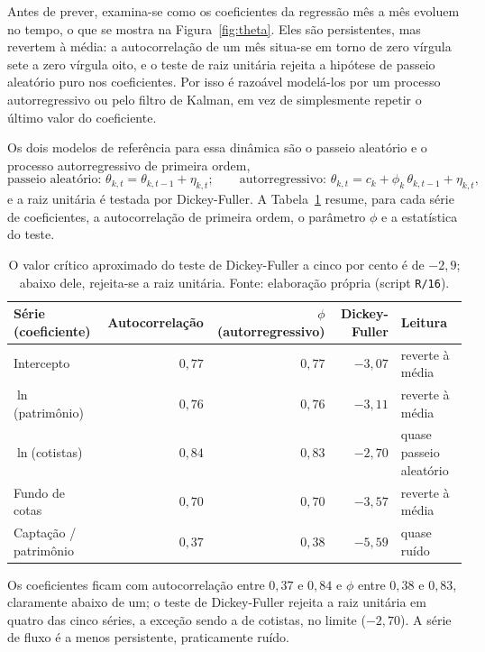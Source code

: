 \documentclass[12pt,a4paper]{article}
\begin{document}
Antes de prever, examina-se como os coeficientes da regressão mês a mês evoluem no tempo, o que se
mostra na Figura~\ref{fig:theta}. Eles são persistentes, mas revertem à média: a autocorrelação
de um mês situa-se em torno de zero vírgula sete a zero vírgula oito, e o teste de raiz unitária
rejeita a hipótese de passeio aleatório puro nos coeficientes. Por isso é razoável modelá-los por
um processo autorregressivo ou pelo filtro de Kalman, em vez de simplesmente repetir o último
valor do coeficiente.

Os dois modelos de referência para essa dinâmica são o passeio aleatório e o processo
autorregressivo de primeira ordem,
\begin{equation}
\text{passeio aleatório: } \theta_{k,t} = \theta_{k,t-1} + \eta_{k,t};
\qquad
\text{autorregressivo: } \theta_{k,t} = c_k + \phi_k\,\theta_{k,t-1} + \eta_{k,t},
\label{eq:dyn}
\end{equation}
e a raiz unitária é testada por Dickey-Fuller. A Tabela~\ref{tab:dyn} resume, para cada série de
coeficientes, a autocorrelação de primeira ordem, o parâmetro $\phi$ e a estatística do teste.

\begin{table}[h]\centering\small
\caption{Dinâmica dos coeficientes da regressão transversal (72 meses).}
\label{tab:dyn}
\begin{tabular}{@{}lrrrl@{}}
\toprule
Série (coeficiente) & Autocorrelação & $\phi$ (autorregressivo) & Dickey-Fuller & Leitura \\
\midrule
Intercepto            & $0{,}77$ & $0{,}77$ & $-3{,}07$ & reverte à média \\
$\ln$(patrimônio)     & $0{,}76$ & $0{,}76$ & $-3{,}11$ & reverte à média \\
$\ln$(cotistas)       & $0{,}84$ & $0{,}83$ & $-2{,}70$ & quase passeio aleatório \\
Fundo de cotas        & $0{,}70$ & $0{,}70$ & $-3{,}57$ & reverte à média \\
Captação / patrimônio & $0{,}37$ & $0{,}38$ & $-5{,}59$ & quase ruído \\
\bottomrule
\end{tabular}
\caption*{\footnotesize O valor crítico aproximado do teste de Dickey-Fuller a cinco por cento é de
$-2{,}9$; abaixo dele, rejeita-se a raiz unitária. Fonte: elaboração própria (script \texttt{R/16}).}
\end{table}

Os coeficientes ficam com autocorrelação entre $0{,}37$ e $0{,}84$ e $\phi$ entre $0{,}38$ e
$0{,}83$, claramente abaixo de um; o teste de Dickey-Fuller rejeita a raiz unitária em quatro das
cinco séries, a exceção sendo a de cotistas, no limite ($-2{,}70$). A série de fluxo é a menos
persistente, praticamente ruído.
\end{document}
